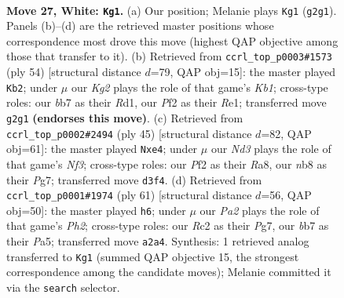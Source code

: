 \documentclass[11pt]{article}
\begin{document}
\clearpage

\begin{figure}[p]\centering
\begin{subfigure}{0.46\textwidth}\centering
\resizebox{\linewidth}{!}{%
\newchessgame
\chessboard[
  setfen={rn4k1/1b6/1p2p3/1Bb2p1p/4r3/3N2BP/PRR2PK1/8 w - - 1 27},
  showmover=false,
  pgfstyle=straightmove, color=movearrow, markmove={g2-g1}
]}
\caption{}
\end{subfigure}\hfill
\begin{subfigure}{0.46\textwidth}\centering
\resizebox{\linewidth}{!}{%
\newchessgame
\chessboard[
  setfen={2rr1k2/1p5p/p4pp1/3bn3/3N2P1/1P6/P3BPP1/1K1RR3 w - - 1 28},
  showmover=false,
  pgfstyle=straightmove, color=movearrow, markmove={b1-b2}
]}
\caption{}
\end{subfigure}
\\[4pt]
\begin{subfigure}{0.46\textwidth}\centering
\resizebox{\linewidth}{!}{%
\newchessgame
\chessboard[
  setfen={r3r1k1/5ppp/p4n2/1pR1bN2/4B3/4B2P/PP3PP1/3R3K b - - 0 23},
  showmover=false,
  pgfstyle=straightmove, color=movearrow, markmove={f6-e4}
]}
\caption{}
\end{subfigure}\hfill
\begin{subfigure}{0.46\textwidth}\centering
\resizebox{\linewidth}{!}{%
\newchessgame
\chessboard[
  setfen={5k2/1rp1n1pp/3b4/pr1p4/3P4/1B3PP1/P2BR2P/2R2K2 b - - 4 31},
  showmover=false,
  pgfstyle=straightmove, color=movearrow, markmove={h7-h6}
]}
\caption{}
\end{subfigure}
\caption{\textbf{Move 27, White: \texttt{Kg1}.} (a) Our position; Melanie plays \texttt{Kg1} (\texttt{g2g1}). Panels (b)--(d) are the retrieved master positions whose correspondence most drove this move (highest QAP objective among those that transfer to it). (b) Retrieved from \texttt{ccrl\_top\_p0003\#1573} (ply 54) [structural distance $d$=79, QAP obj=15]: the master played \texttt{Kb2}; under $\mu$ our \emph{Kg2} plays the role of that game's \emph{Kb1}; cross-type roles: our \emph{b}b7 as their \emph{R}d1, our \emph{P}f2 as their \emph{R}e1; transferred move \texttt{g2g1} \textbf{(endorses this move)}. (c) Retrieved from \texttt{ccrl\_top\_p0002\#2494} (ply 45) [structural distance $d$=82, QAP obj=61]: the master played \texttt{Nxe4}; under $\mu$ our \emph{Nd3} plays the role of that game's \emph{Nf3}; cross-type roles: our \emph{P}f2 as their \emph{R}a8, our \emph{n}b8 as their \emph{P}g7; transferred move \texttt{d3f4}. (d) Retrieved from \texttt{ccrl\_top\_p0001\#1974} (ply 61) [structural distance $d$=56, QAP obj=50]: the master played \texttt{h6}; under $\mu$ our \emph{Pa2} plays the role of that game's \emph{Ph2}; cross-type roles: our \emph{R}c2 as their \emph{P}g7, our \emph{b}b7 as their \emph{P}a5; transferred move \texttt{a2a4}. Synthesis: 1 retrieved analog transferred to \texttt{Kg1} (summed QAP objective 15, the strongest correspondence among the candidate moves); Melanie committed it via the \texttt{search} selector.}
\label{fig:thought-m52}
\end{figure}
\end{document}
